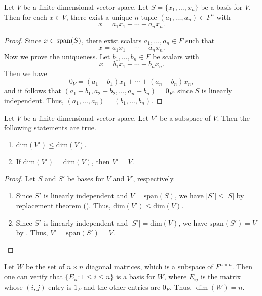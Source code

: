 \begin{proposition}\label{prop:coordinate}
  Let $V$ be a finite-dimensional vector space.
  Let $S = \{x_1, \dots, x_n\}$ be a basis for $V$.
  Then for each $x \in V$, there exist a unique $n$-tuple
  $(a_1, \dots, a_n) \in F^n$ with
  \begin{equation*}
    x = a_1x_1 + \cdots + a_nx_n.
  \end{equation*}
\end{proposition}
\begin{proof}
  Since $x \in \operatorname{span}(S)$, there exist scalars $a_1, \dots, a_n \in F$ such that
  \begin{equation*}
    x = a_1x_1 + \cdots + a_nx_n.
  \end{equation*}
  Now we prove the uniqueness.
  Let $b_1, \dots, b_n \in F$ be scalars with
  \begin{equation*}
    x = b_1x_1 + \cdots + b_nx_n.
  \end{equation*}
  Then we have
  \begin{equation*}
    0_V = (a_1 - b_1)x_1 + \cdots + (a_n - b_n)x_n,
  \end{equation*}
  and it follows that $(a_1 - b_1, a_2 - b_2, \dots, a_n - b_n) = 0_{F^n}$
  since $S$ is linearly independent.
  Thus, $(a_1, \dots, a_n) = (b_1, \dots, b_n)$.
\end{proof}

\begin{proposition}\label{prop:subspace-dimension}
  Let $V$ be a finite-dimensional vector space.
  Let $V'$ be a subspace of $V$.
  Then the following statements are true.
  \begin{enumerate}
    \item $\mathrm{dim}(V') \leq \mathrm{dim}(V)$.
    \item If $\mathrm{dim}(V') = \mathrm{dim}(V)$, then $V' = V$.
  \end{enumerate}
\end{proposition}
\begin{proof}
  Let $S$ and $S'$ be bases for $V$ and $V'$, respectively.
  \begin{enumerate}
    \item Since $S'$ is linearly independent and $V = \mathrm{span}(S)$,
      we have $|S'| \leq |S|$ by replacement theorem ().
      Thus, $\mathrm{dim}(V') \leq \mathrm{dim}(V)$.
    \item Since $S'$ is linearly independent and $|S'| = \mathrm{dim}(V)$,
      we have $\mathrm{span}(S') = V$ by .
      Thus, $V' = \mathrm{span}(S') = V$. \qedhere
  \end{enumerate}
\end{proof}

\begin{example}
  Let $W$ be the set of $n \times n$ diagonal matrices, which is a subspace of
  $F^{n \times n}$.
  Then one can verify that $\{E_{ii}: 1 \leq i \leq n\}$ is a basis for $W$,
  where $E_{ij}$ is the matrix whose $(i, j)$-entry is $1_F$ and the other
  entries are $0_F$.
  Thus, $\dim(W) = n$.
\end{example}